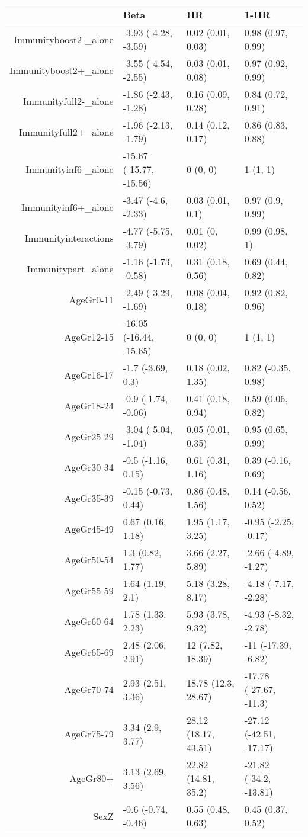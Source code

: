 \begin{table}[ht]
\centering
\begin{tabular}{rlll}
  \hline
 & Beta & HR & 1-HR \\ 
  \hline
Immunityboost2-\_alone & -3.93 (-4.28, -3.59) & 0.02 (0.01, 0.03) & 0.98 (0.97, 0.99) \\ 
  Immunityboost2+\_alone & -3.55 (-4.54, -2.55) & 0.03 (0.01, 0.08) & 0.97 (0.92, 0.99) \\ 
  Immunityfull2-\_alone & -1.86 (-2.43, -1.28) & 0.16 (0.09, 0.28) & 0.84 (0.72, 0.91) \\ 
  Immunityfull2+\_alone & -1.96 (-2.13, -1.79) & 0.14 (0.12, 0.17) & 0.86 (0.83, 0.88) \\ 
  Immunityinf6-\_alone & -15.67 (-15.77, -15.56) & 0 (0, 0) & 1 (1, 1) \\ 
  Immunityinf6+\_alone & -3.47 (-4.6, -2.33) & 0.03 (0.01, 0.1) & 0.97 (0.9, 0.99) \\ 
  Immunityinteractions & -4.77 (-5.75, -3.79) & 0.01 (0, 0.02) & 0.99 (0.98, 1) \\ 
  Immunitypart\_alone & -1.16 (-1.73, -0.58) & 0.31 (0.18, 0.56) & 0.69 (0.44, 0.82) \\ 
  AgeGr0-11 & -2.49 (-3.29, -1.69) & 0.08 (0.04, 0.18) & 0.92 (0.82, 0.96) \\ 
  AgeGr12-15 & -16.05 (-16.44, -15.65) & 0 (0, 0) & 1 (1, 1) \\ 
  AgeGr16-17 & -1.7 (-3.69, 0.3) & 0.18 (0.02, 1.35) & 0.82 (-0.35, 0.98) \\ 
  AgeGr18-24 & -0.9 (-1.74, -0.06) & 0.41 (0.18, 0.94) & 0.59 (0.06, 0.82) \\ 
  AgeGr25-29 & -3.04 (-5.04, -1.04) & 0.05 (0.01, 0.35) & 0.95 (0.65, 0.99) \\ 
  AgeGr30-34 & -0.5 (-1.16, 0.15) & 0.61 (0.31, 1.16) & 0.39 (-0.16, 0.69) \\ 
  AgeGr35-39 & -0.15 (-0.73, 0.44) & 0.86 (0.48, 1.56) & 0.14 (-0.56, 0.52) \\ 
  AgeGr45-49 & 0.67 (0.16, 1.18) & 1.95 (1.17, 3.25) & -0.95 (-2.25, -0.17) \\ 
  AgeGr50-54 & 1.3 (0.82, 1.77) & 3.66 (2.27, 5.89) & -2.66 (-4.89, -1.27) \\ 
  AgeGr55-59 & 1.64 (1.19, 2.1) & 5.18 (3.28, 8.17) & -4.18 (-7.17, -2.28) \\ 
  AgeGr60-64 & 1.78 (1.33, 2.23) & 5.93 (3.78, 9.32) & -4.93 (-8.32, -2.78) \\ 
  AgeGr65-69 & 2.48 (2.06, 2.91) & 12 (7.82, 18.39) & -11 (-17.39, -6.82) \\ 
  AgeGr70-74 & 2.93 (2.51, 3.36) & 18.78 (12.3, 28.67) & -17.78 (-27.67, -11.3) \\ 
  AgeGr75-79 & 3.34 (2.9, 3.77) & 28.12 (18.17, 43.51) & -27.12 (-42.51, -17.17) \\ 
  AgeGr80+ & 3.13 (2.69, 3.56) & 22.82 (14.81, 35.2) & -21.82 (-34.2, -13.81) \\ 
  SexZ & -0.6 (-0.74, -0.46) & 0.55 (0.48, 0.63) & 0.45 (0.37, 0.52) \\ 
   \hline
\end{tabular}
\end{table}
